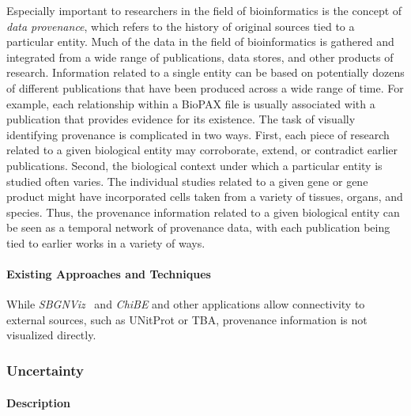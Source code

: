 Especially important to researchers in the field of bioinformatics is the concept of \textit{data provenance}, which refers to the history of original sources tied to a particular entity.
Much of the data in the field of bioinformatics is gathered and integrated from a wide range of publications, data stores, and other products of research.
Information related to a single entity can be based on potentially dozens of different publications that have been produced across a wide range of time.
For example, each relationship within a BioPAX file is usually associated with a publication that provides evidence for its existence.
The task of visually identifying provenance is complicated in two ways.
First, each piece of research related to a given biological entity may corroborate, extend, or contradict earlier publications.
Second, the biological context under which a particular entity is studied often varies.
The individual studies related to a given gene or gene product might have incorporated cells taken from a variety of tissues, organs, and species.
Thus, the provenance information related to a given biological entity can be seen as a temporal network of provenance data, with each publication being tied to earlier works in a variety of ways.

\paragraph{Existing Approaches and Techniques}

While \textit{SBGNViz}~\cite{SBGNViz2015} and \textit{ChiBE}\cite{Babur2010chibe} and other applications allow connectivity to external sources, such as UNitProt or TBA, provenance information is not visualized directly.


\subsubsection{Uncertainty}

\paragraph{Description}

